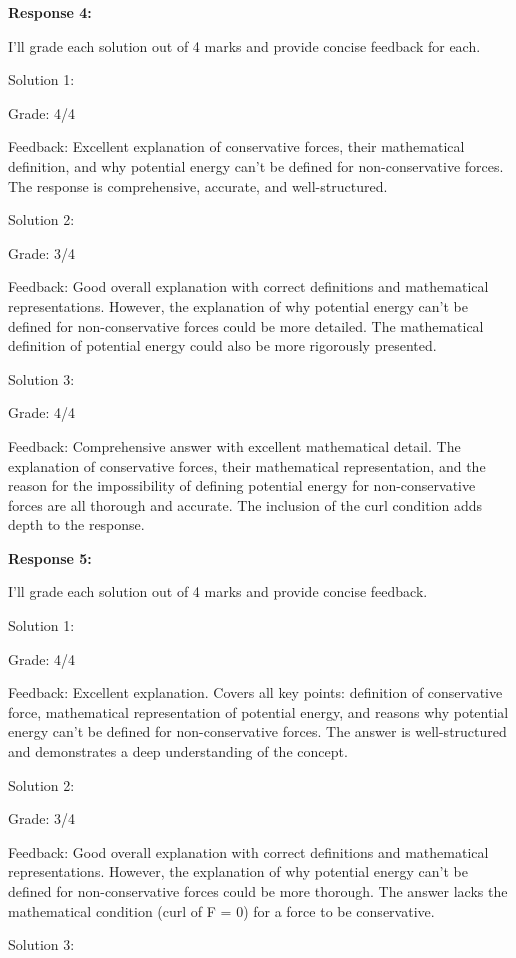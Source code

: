 \documentclass[a4paper,11pt]{article}
\begin{document}
\bigskip
\textbf{Response 4:}

I'll grade each solution out of 4 marks and provide concise feedback for each.

Solution 1:

Grade: 4/4

Feedback: Excellent explanation of conservative forces, their mathematical definition, and why potential energy can't be defined for non-conservative forces. The response is comprehensive, accurate, and well-structured.

Solution 2:

Grade: 3/4

Feedback: Good overall explanation with correct definitions and mathematical representations. However, the explanation of why potential energy can't be defined for non-conservative forces could be more detailed. The mathematical definition of potential energy could also be more rigorously presented.

Solution 3:

Grade: 4/4

Feedback: Comprehensive answer with excellent mathematical detail. The explanation of conservative forces, their mathematical representation, and the reason for the impossibility of defining potential energy for non-conservative forces are all thorough and accurate. The inclusion of the curl condition adds depth to the response.

\bigskip
\textbf{Response 5:}

I'll grade each solution out of 4 marks and provide concise feedback.

Solution 1:

Grade: 4/4

Feedback: Excellent explanation. Covers all key points: definition of conservative force, mathematical representation of potential energy, and reasons why potential energy can't be defined for non-conservative forces. The answer is well-structured and demonstrates a deep understanding of the concept.

Solution 2:

Grade: 3/4

Feedback: Good overall explanation with correct definitions and mathematical representations. However, the explanation of why potential energy can't be defined for non-conservative forces could be more thorough. The answer lacks the mathematical condition (curl of F = 0) for a force to be conservative.

Solution 3:
\end{document}
